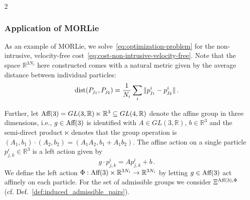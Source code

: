 \documentclass{article}
\newtheorem{remark}[theorem]{Remark}
\newcommand{\R}{\mathbb{R}}                                 %
\begin{document}
\begin{multicols}{2}
 



\subsubsection{Application of MORLie}
As an example of MORLie, we solve~\eqref{eq:optimization-problem} for the non-intrusive, velocity-free cost~\eqref{eq:cost-non-intrusive-velocity-free}. Note that the space $\R^{3N_i}$ here constructed comes with a natural metric given by the average distance between individual particles: 
\begin{equation}\label{eq:dist_particle_cloud}
    \textnormal{dist}(P_{j_1},P_{j_2}) = \frac{1}{N_i} \sum_i \| p^i_{j_1} - p^i_{j_2} \|\,. 
\end{equation}

Further, let $\textnormal{Aff}(3) = GL(3,\R)\ltimes \R^3 \subseteq GL(4,\R)$ denote the affine group in three dimensions, i.e., $g \in \textnormal{Aff}(3)$ is identified with $A \in GL(3,\R),\,b \in \R^3$ and the semi-direct product $\ltimes$ denotes that the group operation is $(A_1,b_1)\cdot(A_2,b_2) = (A_1A_2, b_1 + A_1b_2)$. The affine action on a single particle $p^i_{j,k} \in \R^3$ is a left action given by
\begin{equation}
    g \cdot p^i_{j,k} = A p^i_{j,k}+b \,.
\end{equation} 
We define the left action $\Phi:\textnormal{Aff}(3)\times\R^{3N_i} \rightarrow \R^{3N_i}$ by letting $g \in \textnormal{Aff}(3)$ act affinely on each particle. For the set of admissible groups we consider $\Xi^{\textnormal{Aff}(3),\Phi}$ (cf. Def.~\ref{def:induced_admissible_pairs}). 


\end{multicols}
\end{document}
